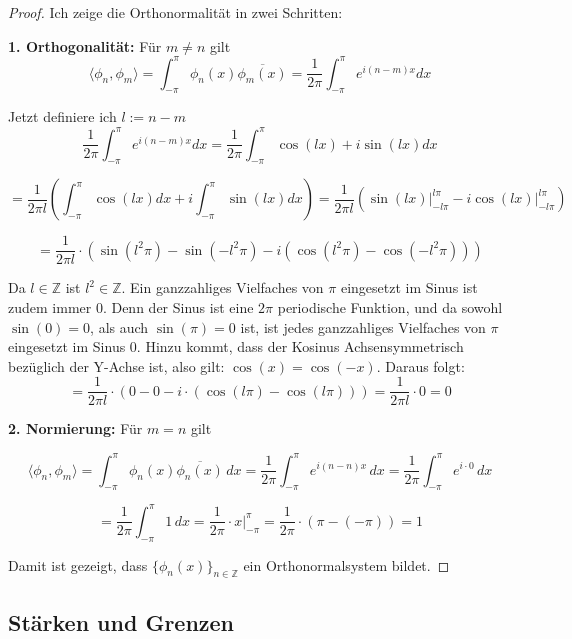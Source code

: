 \documentclass[a4paper,12pt]{article}
\theoremstyle{definition}
\theoremstyle{remark}
\begin{document}
        \begin{proof}
            Ich zeige die Orthonormalität in zwei Schritten: 
            
            \textbf{1. Orthogonalität:}  
            Für $m \neq n$ gilt
            $$\langle \phi_n, \phi_m \rangle = \int_{-\pi}^{\pi}{\phi_n(x) \overline{\phi_m(x)}} = \frac{1}{2\pi}\int_{-\pi}^\pi{e^{i(n-m)x}dx}$$
            
            Jetzt definiere ich $l := n-m$
            \[\frac{1}{2\pi}\int_{-\pi}^\pi{e^{i(n-m)x}dx} = \frac{1}{2\pi}\int_{-\pi}^\pi{\cos(lx) + i \sin (lx)} dx\] 
            
            \[= \frac{1}{2\pi l}\left(\int_{-\pi}^\pi{\cos (lx) dx} + i\int_{-\pi}^\pi{ \sin (lx) dx} \right)  = \frac{1}{2\pi l} \left(\sin(lx)\big|_{-l\pi}^{l\pi} - i\cos(lx)\big|_{-l\pi}^{l\pi} \right)\]
            
            \[= \frac{1}{2\pi l} \cdot \left(\sin(l^2\pi) - \sin(-l^2\pi) - i\left(\cos(l^2\pi) - \cos(-l^2\pi)\right)\right) \]
            
            Da $l\in \mathbb{Z}$ ist $l^2 \in \mathbb{Z}$. Ein ganzzahliges Vielfaches von $\pi$
            eingesetzt im Sinus ist zudem immer 0. Denn der Sinus ist eine $2\pi$ periodische Funktion, und da
            sowohl $\sin(0) = 0$, als auch $\sin (\pi) = 0$ ist, ist jedes ganzzahliges Vielfaches von $\pi$ eingesetzt 
            im Sinus 0. Hinzu kommt, dass der Kosinus Achsensymmetrisch bezüglich der Y-Achse ist, also gilt:
            $\cos (x) =  \cos (-x)$. Daraus folgt:
            \[= \frac{1}{2\pi l} \cdot (0 - 0 - i\cdot(\cos(l\pi) - \cos(l\pi))) = \frac{1}{2\pi l} \cdot 0 = 0\]
            
            
            \textbf{2. Normierung:}  
            Für $m = n$ gilt
            
            \[\langle \phi_n, \phi_m \rangle = \int_{-\pi}^{\pi} \phi_n(x) \overline{\phi_n(x)} \, dx = \frac{1}{2\pi} \int_{-\pi}^{\pi} e^{i(n -n) x}\, dx = \frac{1}{2\pi} \int_{-\pi}^{\pi} e^{i\cdot0} \, dx\]
            
            \[= \frac{1}{2\pi} \int_{-\pi}^{\pi} 1 \, dx = \frac{1}{2\pi} \cdot x \Big|_{-\pi}^{\pi} = \frac{1}{2\pi} \cdot (\pi-(-\pi)) = 1\]
            
            Damit ist gezeigt, dass $\{\phi_n(x)\}_{n\in\mathbb{Z}}$ ein Orthonormalsystem bildet.
        \end{proof}
\subsection{Stärken und Grenzen}
\end{document}
